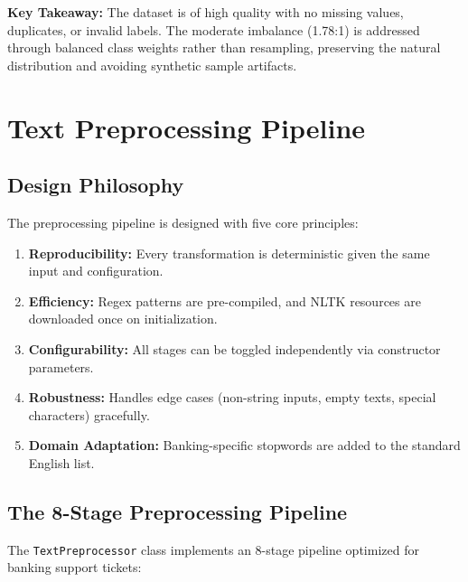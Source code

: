 \documentclass[12pt,a4paper]{article}
\begin{document}
\begin{tipbox}
\textbf{Key Takeaway:} The dataset is of high quality with no missing values, duplicates, or invalid labels. The moderate imbalance (1.78:1) is addressed through balanced class weights rather than resampling, preserving the natural distribution and avoiding synthetic sample artifacts.
\end{tipbox}

\newpage
\section{Text Preprocessing Pipeline}
\label{sec:preprocessing}

\subsection{Design Philosophy}
\label{subsec:preproc-design}

The preprocessing pipeline is designed with five core principles:
\begin{enumerate}[leftmargin=*]
    \item \textbf{Reproducibility:} Every transformation is deterministic given the same input and configuration.
    \item \textbf{Efficiency:} Regex patterns are pre-compiled, and NLTK resources are downloaded once on initialization.
    \item \textbf{Configurability:} All stages can be toggled independently via constructor parameters.
    \item \textbf{Robustness:} Handles edge cases (non-string inputs, empty texts, special characters) gracefully.
    \item \textbf{Domain Adaptation:} Banking-specific stopwords are added to the standard English list.
\end{enumerate}

\subsection{The 8-Stage Preprocessing Pipeline}
\label{subsec:pipeline-stages}

The \texttt{TextPreprocessor} class implements an 8-stage pipeline optimized for banking support tickets:
\end{document}
